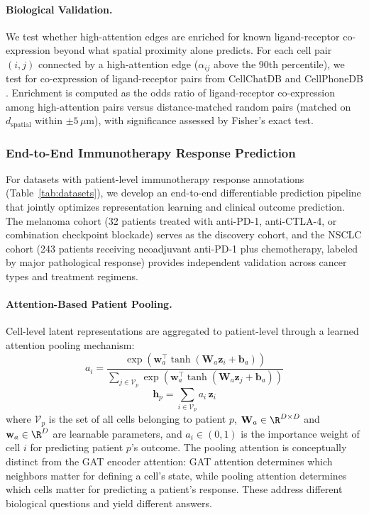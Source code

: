 \documentclass{article}
\begin{document}
\paragraph{Biological Validation.} We test whether high-attention edges are enriched for known ligand-receptor co-expression beyond what spatial proximity alone predicts. For each cell pair $(i, j)$ connected by a high-attention edge ($\alpha_{ij}$ above the 90th percentile), we test for co-expression of ligand-receptor pairs from CellChatDB \cite{jin2021inference} and CellPhoneDB \cite{efremova2020cellphonedb}. Enrichment is computed as the odds ratio of ligand-receptor co-expression among high-attention pairs versus distance-matched random pairs (matched on $d_{\text{spatial}}$ within $\pm 5\,\mu$m), with significance assessed by Fisher's exact test.


\subsubsection{End-to-End Immunotherapy Response Prediction}
\label{sec:prediction}

For datasets with patient-level immunotherapy response annotations (Table~\ref{tab:datasets}), we develop an end-to-end differentiable prediction pipeline that jointly optimizes representation learning and clinical outcome prediction. The melanoma cohort (32 patients treated with anti-PD-1, anti-CTLA-4, or combination checkpoint blockade) serves as the discovery cohort, and the NSCLC cohort (243 patients receiving neoadjuvant anti-PD-1 plus chemotherapy, labeled by major pathological response) provides independent validation across cancer types and treatment regimens.

\paragraph{Attention-Based Patient Pooling.} Cell-level latent representations are aggregated to patient-level through a learned attention pooling mechanism:
\begin{equation}
    a_i = \frac{\exp\!\left(\mathbf{w}_a^\top \tanh(\mathbf{W}_a \mathbf{z}_i + \mathbf{b}_a)\right)}{\sum_{j \in \mathcal{V}_p} \exp\!\left(\mathbf{w}_a^\top \tanh(\mathbf{W}_a \mathbf{z}_j + \mathbf{b}_a)\right)}
    \label{eq:pool_attention}
\end{equation}
\begin{equation}
    \mathbf{h}_p = \sum_{i \in \mathcal{V}_p} a_i \, \mathbf{z}_i
    \label{eq:patient_embed}
\end{equation}
where $\mathcal{V}_p$ is the set of all cells belonging to patient $p$, $\mathbf{W}_a \in \R^{D \times D}$ and $\mathbf{w}_a \in \R^{D}$ are learnable parameters, and $a_i \in (0, 1)$ is the importance weight of cell $i$ for predicting patient $p$'s outcome. The pooling attention is conceptually distinct from the GAT encoder attention: GAT attention determines which neighbors matter for defining a cell's state, while pooling attention determines which cells matter for predicting a patient's response. These address different biological questions and yield different answers.
\end{document}
